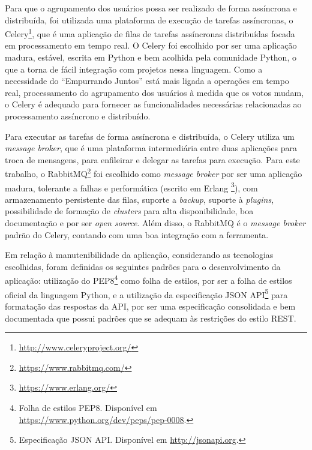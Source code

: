     Para que o agrupamento dos usuários possa ser realizado de forma assíncrona e distribuída, 
    foi utilizada uma plataforma de execução de tarefas assíncronas,
    o Celery\footnote{\href{http://www.celeryproject.org/}{http://www.celeryproject.org/}},
    que é uma aplicação de filas de tarefas assíncronas distribuídas focada em processamento em tempo real.
    O Celery foi escolhido por ser uma aplicação madura, estável, escrita em Python e bem acolhida pela comunidade Python,
    o que a torna de fácil integração com projetos nessa linguagem.
    Como a necessidade do ``Empurrando Juntos'' está mais ligada a operações em tempo real,
    processamento do agrupamento dos usuários à medida que os votos mudam,
    o Celery é adequado para fornecer as funcionalidades necessárias relacionadas ao processamento assíncrono e distribuído.
    
    Para executar as tarefas de forma assíncrona e distribuída, o Celery utiliza um \textit{message broker},
    que é uma plataforma intermediária entre duas aplicações para troca de mensagens,
    para enfileirar e delegar as tarefas para execução. 
    Para este trabalho, o RabbitMQ\footnote{\href{https://www.rabbitmq.com/}{https://www.rabbitmq.com/}}
    foi escolhido como \textit{message broker} por ser uma aplicação madura, tolerante a falhas e performática
    (escrito em Erlang \footnote{\href{https://www.erlang.org/}{https://www.erlang.org/}}),
    com armazenamento persistente das filas, suporte a \textit{backup}, suporte à \textit{plugins},
    possibilidade de formação de \textit{clusters} para alta disponibilidade,
    boa documentação e por ser \textit{open source}.
    Além disso, o RabbitMQ é o \textit{message broker} padrão do Celery, contando com uma boa integração com a ferramenta.
    
    Em relação à manutenibilidade da aplicação, considerando as tecnologias escolhidas,
    foram definidas os seguintes padrões para o desenvolvimento da aplicação:
    utilização do PEP8\footnote{Folha de estilos PEP8. Disponível em \href{https://www.python.org/dev/peps/pep-0008/}{https://www.python.org/dev/peps/pep-0008}.}
    como folha de estilos, por ser a folha de estilos oficial da linguagem Python,
    e a utilização da especificação JSON API\footnote{Especificação JSON API. Disponível em \href{http://jsonapi.org/}{http://jsonapi.org}.}
    para formatação das respostas da API, por ser uma especificação consolidada e bem documentada que possui padrões que
    se adequam às restrições do estilo REST.
    
